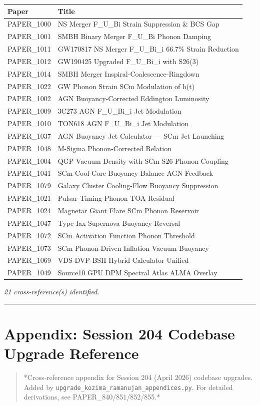 \documentclass[12pt,a4paper]{article}
\begin{document}
\begin{table}[H]
\centering
\small
\begin{tabularx}{\linewidth}{@{}>{\raggedright\arraybackslash}X>{\raggedright\arraybackslash}X@{}}
\toprule
Paper & Title \tabularnewline
\midrule
PAPER\_1000 & NS Merger F\_{U\_Bi} Strain Suppression \& BCS Gap \tabularnewline
PAPER\_1001 & SMBH Binary Merger F\_{U\_Bi} Phonon Damping \tabularnewline
PAPER\_1011 & GW170817 NS Merger F\_{U\_Bi\_i} 66.7\% Strain Reduction \tabularnewline
PAPER\_1012 & GW190425 Upgraded F\_{U\_Bi\_i} with S26(3) \tabularnewline
PAPER\_1014 & SMBH Merger Inspiral-Coalescence-Ringdown \tabularnewline
PAPER\_1022 & GW Phonon Strain SCm Modulation of h(t) \tabularnewline
PAPER\_1002 & AGN Buoyancy-Corrected Eddington Luminosity \tabularnewline
PAPER\_1009 & 3C273 AGN F\_{U\_Bi\_i} Jet Modulation \tabularnewline
PAPER\_1010 & TON618 AGN F\_{U\_Bi\_i} Jet Modulation \tabularnewline
PAPER\_1037 & AGN Buoyancy Jet Calculator --- SCm Jet Launching \tabularnewline
PAPER\_1048 & M-Sigma Phonon-Corrected Relation \tabularnewline
PAPER\_1004 & QGP Vacuum Density with SCm S26 Phonon Coupling \tabularnewline
PAPER\_1041 & SCm Cool-Core Buoyancy Balance AGN Feedback \tabularnewline
PAPER\_1079 & Galaxy Cluster Cooling-Flow Buoyancy Suppression \tabularnewline
PAPER\_1021 & Pulsar Timing Phonon TOA Residual \tabularnewline
PAPER\_1024 & Magnetar Giant Flare SCm Phonon Reservoir \tabularnewline
PAPER\_1047 & Type Iax Supernova Buoyancy Reversal \tabularnewline
PAPER\_1072 & SCm Activation Function Phonon Threshold \tabularnewline
PAPER\_1073 & SCm Phonon-Driven Inflation Vacuum Buoyancy \tabularnewline
PAPER\_1069 & VDS-DVP-BSH Hybrid Calculator Unified \tabularnewline
PAPER\_1049 & Source10 GPU DPM Spectral Atlas ALMA Overlay \tabularnewline
\bottomrule
\end{tabularx}
\end{table}

\emph{21 cross-reference(s) identified.}

\medskip\hrule\medskip

\section{Appendix: Session 204 Codebase Upgrade Reference}

\begin{quote}
*Cross-reference appendix for Session 204 (April 2026) codebase upgrades.
Added by \texttt{upgrade\_{kozima\_ramanujan\_appendices}.py}. For detailed derivations,
see PAPER\_840/851/852/855.*
\end{quote}
\end{document}

